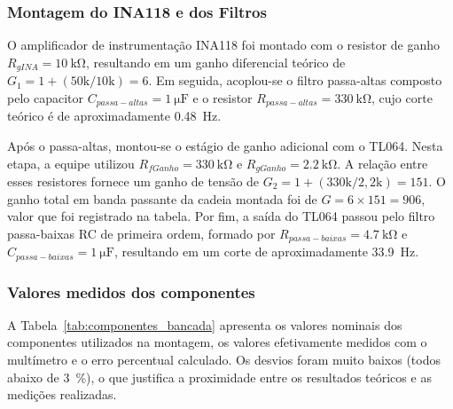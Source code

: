 \documentclass[11pt,a4paper]{article}
\begin{document}
\subsubsection{Montagem do INA118 e dos Filtros}

O amplificador de instrumentação INA118 foi montado com o resistor de ganho $R_{gINA} = \SI{10}{\kilo\ohm}$, resultando em um ganho diferencial teórico de $G_1 = 1 + (50\text{k}/10\text{k}) = 6$. Em seguida, acoplou-se o filtro passa-altas composto pelo capacitor $C_{passa-altas} = \SI{1}{\micro\farad}$ e o resistor $R_{passa-altas} = \SI{330}{\kilo\ohm}$, cujo corte teórico é de aproximadamente \SI{0,48}{\hertz}.

Após o passa-altas, montou-se o estágio de ganho adicional com o TL064. Nesta etapa, a equipe utilizou $R_{fGanho} = \SI{330}{\kilo\ohm}$ e $R_{gGanho} = \SI{2,2}{\kilo\ohm}$. A relação entre esses resistores fornece um ganho de tensão de $G_2 = 1 + (330\text{k}/2,2\text{k}) = 151$. O ganho total em banda passante da cadeia montada foi de $G = 6 \times 151 = 906$, valor que foi registrado na tabela. Por fim, a saída do TL064 passou pelo filtro passa-baixas RC de primeira ordem, formado por $R_{passa-baixas} = \SI{4,7}{\kilo\ohm}$ e $C_{passa-baixas} = \SI{1}{\micro\farad}$, resultando em um corte de aproximadamente \SI{33,9}{\hertz}.

\subsubsection{Valores medidos dos componentes}

A Tabela~\ref{tab:componentes_bancada} apresenta os valores nominais dos componentes utilizados na montagem, os valores efetivamente medidos com o multímetro e o erro percentual calculado. Os desvios foram muito baixos (todos abaixo de \SI{3}{\%}), o que justifica a proximidade entre os resultados teóricos e as medições realizadas.
\end{document}
